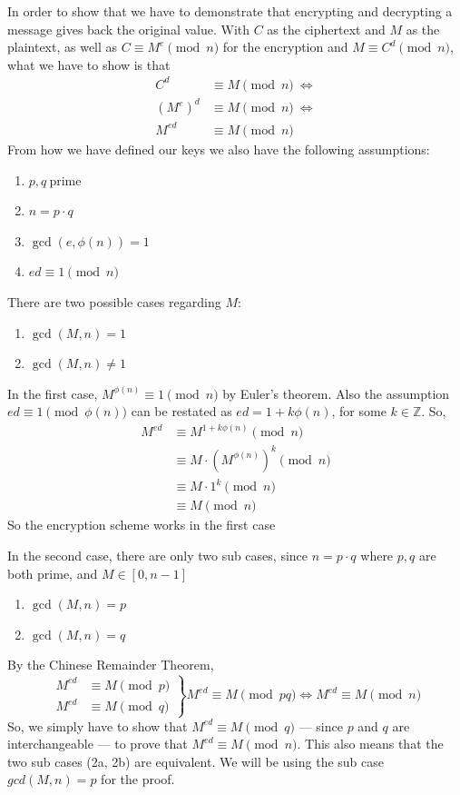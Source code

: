 \documentclass[12pt, titlepage]{article}
\begin{document}
In order to show that we have to demonstrate that encrypting and decrypting a message gives
back the original value. With $C$ as the ciphertext and $M$ as the plaintext, as well as $C
\equiv M^e \pmod{n}$ for the encryption and $M \equiv C^d \pmod{n}$, what we have to show is
that
%
\begin{align*}
    C^d     &\equiv M \pmod{n}\ \iff \\
    (M^e)^d &\equiv M \pmod{n}\ \iff \\
    M^{ed}  &\equiv M \pmod{n}
\end{align*}
%
From how we have defined our keys we also have the following assumptions:
%
\begin{enumerate}
    \item $p,q\ \text{prime}$
    \item $n = p \cdot q$
    \item $\gcd(e, \phi(n)) = 1$ 
    \item $ed \equiv 1 \pmod{n}$
\end{enumerate}
%
There are two possible cases regarding $M$:
%
\begin{enumerate}
    \item $\gcd(M, n) = 1$
    \item $\gcd(M, n) \not= 1$
\end{enumerate}
%
In the first case, $M^{\phi(n)} \equiv 1 \pmod{n}$ by Euler's theorem. Also the assumption
$ed \equiv 1 \pmod{\phi(n)}$ can be restated as $ed = 1 + k\phi(n)$, for some $k \in
\mathbb{Z}$. So, 
%
\begin{align*}
    M^{ed} &\equiv M^{1 + k\phi(n)} \pmod{n} \\
           &\equiv M \cdot (M^{\phi(n)})^k  \pmod{n} \\
           &\equiv M \cdot 1^k \pmod{n} \\
           &\equiv M \pmod{n}
\end{align*}
%
So the encryption scheme works in the first case

In the second case, there are only two sub cases, since $n = p \cdot q$ where $p, q$ are
both prime, and $ M \in \left[0, n-1\right]$
%
\renewcommand{\labelenumi}{2\alph{enumi}.}
\begin{enumerate}
    \item $\gcd(M, n) = p$
    \item $\gcd(M, n) = q$
\end{enumerate}
%
By the Chinese Remainder Theorem,
%
\begin{equation*}
    \left.
        \begin{aligned}
            M^{ed} &\equiv M \pmod{p}\\
            M^{ed} &\equiv M \pmod{q}
        \end{aligned}
    \right\}
    M^{ed} \equiv M \pmod{pq} \iff M^{ed} \equiv M \pmod{n}
\end{equation*}
%
So, we simply have to show that $M^{ed} \equiv M \pmod{q}$ --- since $p$ and $q$ are
interchangeable --- to prove that $M^{ed} \equiv M \pmod{n}$. This also means that the two
sub cases (2a, 2b) are equivalent. We will be using the sub case $gcd(M, n) = p$ for the
proof.
\end{document}
